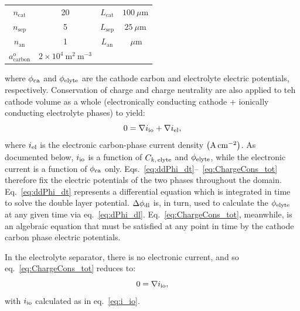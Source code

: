 \documentclass{elsarticle}
\begin{document}
\begin{table}[h!]
\begin{center}
\begin{tabular}{ |cc|cc| } 
    \hline
    $n_\mathrm{cat}$ & 20 & $L_\mathrm{cat}$ & $100 ~ \mu \mathrm{m}$ \\
    $n_\mathrm{sep}$ & 5 & $L_\mathrm{sep}$ & $25 ~ \mu \mathrm{m}$ \\
    $n_\mathrm{an}$ & 1 & $L_\mathrm{an}$ & $~ \mu \mathrm{m}$ \\
    $a^\mathrm{o}_\mathrm{carbon}$ & $2 \times 10^{4} ~ \mathrm{m}^{2} ~ \mathrm{m}^{-3}$ & & \\
    \hline
\end{tabular}
\end{center}
\end{table}

where $\phi_{\rm ca}$ and $\phi_{\rm elyte}$ are the cathode carbon and electrolyte electric potentials, respectively. Conservation of charge and charge neutrality are also applied to teh cathode volume as a whole (electronically conducting cathode + ionically conducting electrolyte phases) to yield:
\begin{equation}\label{eq:ChargeCons_tot}
    0 = \nabla i_{\rm io} + \nabla i_{\rm el},
\end{equation}
where $i_{\rm el}$ is the electronic carbon-phase current density $\left({\rm A\,cm^{-2}} \right)$. As documented below, $i_{\rm io}$ is a function of $C_{k,\,{\rm elyte}}$ and $\phi_{\rm elyte}$, while the electronic current is a function of $\phi_{\rm ca}$ only.  Eqs.~\ref{eq:ddPhi_dt}--~\ref{eq:ChargeCons_tot} therefore fix the electric potentials of the two phases throughout the domain. Eq.~\ref{eq:ddPhi_dt} represents a differential equation which is integrated in time to solve the double layer potential. $\Delta \phi_{\rm dl}$ is, in turn, used to calculate the $\phi_{\rm elyte}$ at any given time via eq.~\ref{eq:dPhi_dl}. Eq.~\ref{eq:ChargeCons_tot}, meanwhile, is an algebraic equation that must be satisfied at any point in time by the cathode carbon phase electric potentials. 

In the electrolyte separator, there is no electronic current, and so eq.~\ref{eq:ChargeCons_tot} reduces to:
\begin{equation}
    0 = \nabla i_{\rm io},
\end{equation}
with $i_{\rm io}$ calculated as in eq.~\ref{eq:i_io}.
\end{document}
